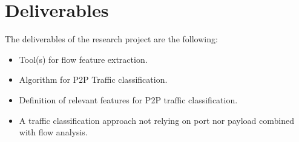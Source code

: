 \section{Deliverables}
The deliverables of the research project are the following:
\begin{itemize}
  \item Tool(s) for flow feature extraction.
  \item Algorithm for P2P Traffic classification.
  \item Definition of relevant features for P2P traffic classification.
  \item A traffic classification approach not relying on port nor payload combined with flow analysis.
\end{itemize}
